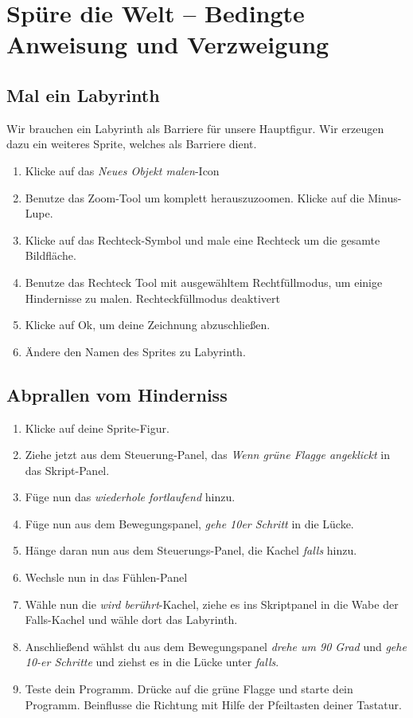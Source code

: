 \section{Spüre die Welt – Bedingte Anweisung und Verzweigung}

\subsection{Mal ein Labyrinth}

Wir brauchen ein Labyrinth als Barriere für unsere Hauptfigur. Wir erzeugen dazu ein weiteres Sprite, welches als Barriere dient.

\begin{enumerate}
\item Klicke auf das \textit{Neues Objekt malen}-Icon 
\item Benutze das Zoom-Tool um komplett herauszuzoomen. Klicke auf die Minus-Lupe.
\item Klicke auf das Rechteck-Symbol und male eine Rechteck um die gesamte Bildfläche.
\item Benutze das Rechteck Tool mit ausgewähltem Rechtfüllmodus, um einige Hindernisse zu malen.
Rechteckfüllmodus deaktivert
\item Klicke auf Ok, um deine Zeichnung abzuschließen.
\item Ändere den Namen des Sprites zu Labyrinth.
\end{enumerate}

\subsection{Abprallen vom Hinderniss}
\begin{enumerate}
\item Klicke auf deine Sprite-Figur.
\item Ziehe jetzt aus dem Steuerung-Panel, das \textit{Wenn grüne Flagge angeklickt} in das Skript-Panel.
\item Füge nun das \textit{wiederhole fortlaufend} hinzu. 
\item Füge nun aus dem Bewegungspanel, \textit{gehe 10er Schritt} in die Lücke.
\item Hänge daran nun aus dem Steuerungs-Panel, die Kachel \textit{falls} hinzu.
\item Wechsle nun in das Fühlen-Panel
\item Wähle nun die \textit{wird berührt}-Kachel, ziehe es ins Skriptpanel in die Wabe der Falls-Kachel und wähle dort das Labyrinth. 
\item Anschließend wählst du aus dem Bewegungspanel \textit{drehe um 90 Grad} und \textit{gehe 10-er Schritte} und ziehst es in die Lücke unter \textit{falls}.
\item Teste dein Programm. Drücke auf die grüne Flagge und starte dein Programm. Beinflusse die Richtung mit Hilfe der Pfeiltasten deiner Tastatur.
\end{enumerate}
